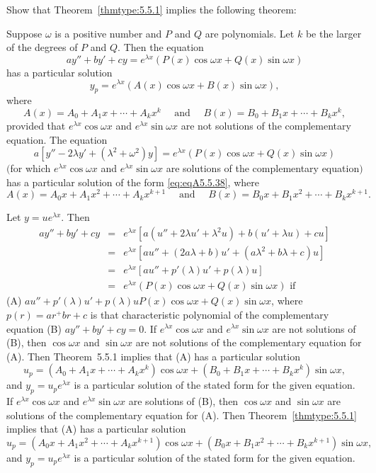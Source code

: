 \documentclass{ximera}
\begin{document}
\begin{problem}\label{exer:5.5.38}
Show that  Theorem~\ref{thmtype:5.5.1} implies the following theorem:

Suppose  $\omega$ is a positive  number and $P$ and $Q$
are polynomials. Let $k$ be the larger of the degrees of $P$ and $Q$.
Then the equation
$$
ay''+by'+cy=e^{\lambda x}\left(P(x)\cos \omega x+Q(x)\sin \omega
x\right)
$$
has a particular solution
\begin{equation}\label{eq:eqA5.5.38}
y_p=e^{\lambda x}\left(A(x)\cos\omega x+B(x)\sin\omega x\right),
\end{equation}
where
$$
A(x)=A_0+A_1x+\cdots+A_kx^k \quad \text{ and }\quad
B(x)=B_0+B_1x+\cdots+B_kx^k,
$$
provided that $e^{\lambda x}\cos\omega x$ and $e^{\lambda x}\sin\omega
x$ are not solutions of  the complementary equation. The equation
$$
a\left[y''-2\lambda
y'+(\lambda^2+\omega^2)y\right]=
e^{\lambda x}\left(P(x)\cos \omega x+Q(x)\sin \omega x\right)
$$
$($for which $e^{\lambda x}\cos\omega x$ and $e^{\lambda x}\sin\omega
x$ are
solutions of the complementary equation$)$ has a particular solution
of the form \ref{eq:eqA5.5.38}, where
$$
A(x)=A_0x+A_1x^2+\cdots+A_kx^{k+1} \quad \text{ and }\quad
B(x)=B_0x+B_1x^2+\cdots+B_kx^{k+1}.
$$

\begin{solution}
    Let $y=ue^{\lambda x}$. Then
\begin{eqnarray*}
ay''+by'+cy&=&e^{\lambda x}\left[a(u''+2\lambda u'+\lambda^2u)
+b(u'+\lambda u)+cu\right]\\
&=&e^{\lambda
x}\left[au''+(2a\lambda+b)u'+(a\lambda^2+b\lambda+c)u\right]\\
&=&e^{\lambda x}\left[au''+p'(\lambda)u'+p(\lambda)u\right]\\
&=&e^{\lambda x}\left(P(x)\cos \omega x+Q(x)\sin \omega x\right)
\mbox{ if}
\end{eqnarray*}
(A) $au''+p'(\lambda)u'+p(\lambda)u
P(x)\cos \omega x+Q(x)\sin \omega x$,
where $p(r)=ar^+br+c$ is that characteristic polynomial
of the  complementary equation (B) $ay''+by'+cy=0$.
If $e^{\lambda x}\cos\omega x$ and $e^{\lambda
x}\sin\omega x$ are not solutions of (B), then
$\cos\omega x$ and $\sin\omega x$ are not solutions of the
complementary equation for (A).  Then  Theorem~5.5.1
implies that  (A) has a particular solution
$$
u_p=(A_0+A_1x+\cdots+A_kx^k)\cos\omega x+
(B_0+B_1x+\cdots+B_kx^k)\sin\omega x,
$$
 and $y_p=u_pe^{\lambda x}$
is a particular solution of the stated form for the given equation.
If $e^{\lambda x}\cos\omega x$ and $e^{\lambda
x}\sin\omega x$ are  solutions of (B), then
$\cos\omega x$ and $\sin\omega x$ are solutions of the
complementary equation for (A).  Then  Theorem~\ref{thmtype:5.5.1}
implies that  (A) has a particular solution
$$
u_p=(A_0x+A_1x^2+\cdots+A_kx^{k+1})\cos\omega x+
(B_0x+B_1x^2+\cdots+B_kx^{k+1})\sin\omega x,
$$
and $y_p=u_pe^{\lambda x}$ is a particular solution of the stated form
for the given equation.
\end{solution}

\end{problem}
\end{document}
